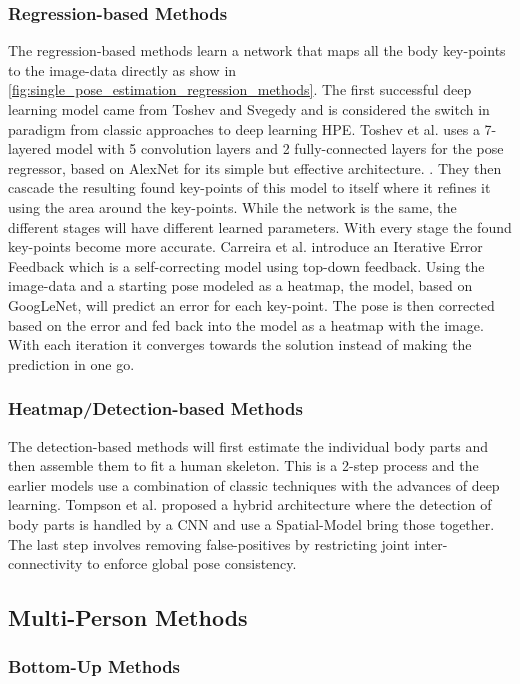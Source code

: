 \subsubsection{Regression-based Methods}
The regression-based methods learn a network that maps all the body key-points to the image-data directly as show in \ref{fig:single_pose_estimation_regression_methods}.
The first successful deep learning model came from Toshev and Svegedy\cite{Toshev2014} and is considered the switch in paradigm from classic approaches to deep learning \gls{HPE}.
Toshev et al. uses a 7-layered model with 5 convolution layers and 2 fully-connected layers for the pose regressor, based on AlexNet for its simple but effective architecture. \cite{AlexNet}.
They then cascade the resulting found key-points of this model to itself where it refines it using the area around the key-points.
While the network is the same, the different stages will have different learned parameters.
With every stage the found key-points become more accurate.
Carreira et al.\cite{CarreiraAFM15} introduce an Iterative Error Feedback which is a self-correcting model using top-down feedback.
Using the image-data and a starting pose modeled as a heatmap, the model, based on GoogLeNet\cite{googlenet}, will predict an error for each key-point.
The pose is then corrected based on the error and fed back into the model as a heatmap with the image.
With each iteration it converges towards the solution instead of making the prediction in one go.

\subsubsection{Heatmap/Detection-based Methods}
The detection-based methods will first estimate the individual body parts and then assemble them to fit a human skeleton.
This is a 2-step process and the earlier models use a combination of classic techniques with the advances of deep learning.
Tompson et al.\cite{TompsonJLB14} proposed a hybrid architecture where the detection of body parts is handled by a \gls{CNN} and use a Spatial-Model bring those together.
The last step involves removing false-positives by restricting joint inter-connectivity to enforce global pose consistency.


\subsection{Multi-Person Methods}


\subsubsection{Bottom-Up Methods}

